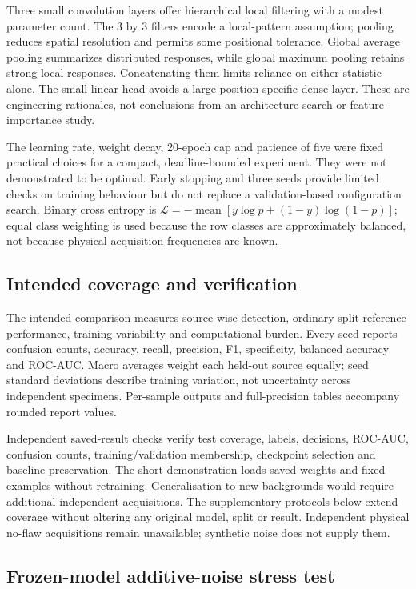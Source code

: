 \documentclass[11pt,a4paper]{article}
\begin{document}
Three small convolution layers offer hierarchical local filtering with a modest parameter count. The 3 by 3 filters encode a local-pattern assumption; pooling reduces spatial resolution and permits some positional tolerance. Global average pooling summarizes distributed responses, while global maximum pooling retains strong local responses. Concatenating them limits reliance on either statistic alone. The small linear head avoids a large position-specific dense layer. These are engineering rationales, not conclusions from an architecture search or feature-importance study.

The learning rate, weight decay, 20-epoch cap and patience of five were fixed practical choices for a compact, deadline-bounded experiment. They were not demonstrated to be optimal. Early stopping and three seeds provide limited checks on training behaviour but do not replace a validation-based configuration search. Binary cross entropy is \(\mathcal{L}=-\operatorname{mean}[y\log p+(1-y)\log(1-p)]\); equal class weighting is used because the row classes are approximately balanced, not because physical acquisition frequencies are known.

\subsection{Intended coverage and verification}

The intended comparison measures source-wise detection, ordinary-split reference performance, training variability and computational burden. Every seed reports confusion counts, accuracy, recall, precision, F1, specificity, balanced accuracy and ROC-AUC. Macro averages weight each held-out source equally; seed standard deviations describe training variation, not uncertainty across independent specimens. Per-sample outputs and full-precision tables accompany rounded report values.

Independent saved-result checks verify test coverage, labels, decisions, ROC-AUC, confusion counts, training/validation membership, checkpoint selection and baseline preservation. The short demonstration loads saved weights and fixed examples without retraining. Generalisation to new backgrounds would require additional independent acquisitions. The supplementary protocols below extend coverage without altering any original model, split or result. Independent physical no-flaw acquisitions remain unavailable; synthetic noise does not supply them.

\subsection{Frozen-model additive-noise stress test}
\end{document}
